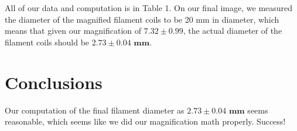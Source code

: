 \documentclass[12pt,letterpaper]{article}
\begin{document}
All of our data and computation is in Table 1. On our final image, we measured the diameter of the magnified filament coils to be 20 mm in diameter, which means that given our magnification of $\mathbf{7.32 \pm 0.99}$, the actual diameter of the filament coils should be $\mathbf{2.73 \pm 0.04} \textbf{ mm}$.

\section{Conclusions}

Our computation of the final filament diameter as $\mathbf{2.73 \pm 0.04} \textbf{ mm}$ seems reasonable, which seems like we did our magnification math properly. Success!

% 
% 
\end{document}
